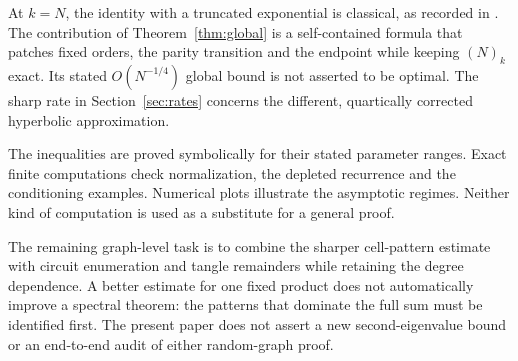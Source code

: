 At $k=N$, the identity with a truncated exponential is classical, as recorded in \cite[Section 1]{DMO}. The contribution of Theorem~\ref{thm:global} is a self-contained formula that patches fixed orders, the parity transition and the endpoint while keeping $(N)_k$ exact. Its stated $O(N^{-1/4})$ global bound is not asserted to be optimal. The sharp rate in Section~\ref{sec:rates} concerns the different, quartically corrected hyperbolic approximation.

The inequalities are proved symbolically for their stated parameter ranges. Exact finite computations check normalization, the depleted recurrence and the conditioning examples. Numerical plots illustrate the asymptotic regimes. Neither kind of computation is used as a substitute for a general proof.

The remaining graph-level task is to combine the sharper cell-pattern estimate with circuit enumeration and tangle remainders while retaining the degree dependence. A better estimate for one fixed product does not automatically improve a spectral theorem: the patterns that dominate the full sum must be identified first. The present paper does not assert a new second-eigenvalue bound or an end-to-end audit of either random-graph proof.
